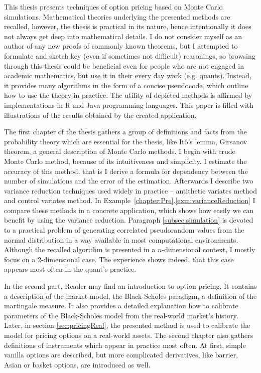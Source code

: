 \documentclass[a4paper,11pt, twoside]{book}
\theoremstyle{definition}
\theoremstyle{remark}
\begin{document}
\noindent
  This thesis presents techniques of option pricing based on Monte Carlo simulations. Mathematical theories underlying the presented methods are recalled, however, the thesis is practical in its nature, hence intentionally it does not always get deep into mathematical details.
  I do not consider myself as an author of any new proofs of commonly known theorems, but I attempted to formulate and sketch key (even if sometimes not difficult) reasonings, so browsing through this thesis could be beneficial even for people who are not engaged in academic mathematics, but use it in their every day work (e.g. quants).
  Instead, it provides many algorithms in the form of a concise pseudocode, which outline how to use the theory in practice. The utility of depicted methods is affirmed by implementations in R and Java programming languages. This paper is filled with illustrations of the results obtained by the created application.
  
  The first chapter of the thesis gathers a group of definitions and facts from the probability theory which are essential for the thesis, like It\^{o}'s lemma, Girsanov theorem, a general description of Monte Carlo methods.
  I begin with crude Monte Carlo method, because of its intuitiveness and simplicity. I estimate the accuracy of this method, that is I derive a formula for dependency between the number of simulations and the error of the estimation. Afterwards I describe two variance reduction techniques used widely in practice -- antithetic variates method and control variates method. In Example~\ref{chapter:Pre}.\ref{exm:varianceReduction} I compare these methods in a concrete application, which shows how easily we can benefit by using the variance reduction.
  Paragraph \ref{subsec:simulation} is devoted to a practical problem of generating correlated pseudorandom values from the normal distribution in a way available in most computational environments. Although the recalled algorithm is presented in a $n$-dimensional context, I mostly focus on a 2-dimensional case. The experience shows indeed, that this case appears most often in the quant's practice.
  
  In the second part, Reader may find an introduction to option pricing. It contains a description of the market model, the Black-Scholes paradigm, a definition of the martingale measure. It also provides a detailed explanation how to calibrate parameters of the Black-Scholes model from the real-world market's history. 
  Later, in section \ref{sec:pricingReal}, the presented method is used to calibrate the model for pricing options on a real-world assets. The second chapter also gathers definitions of instruments which appear in practice most often. At first, simple vanilla options are described, but more complicated derivatives, like barrier, Asian or basket options, are introduced as well. 
  
\end{document}
